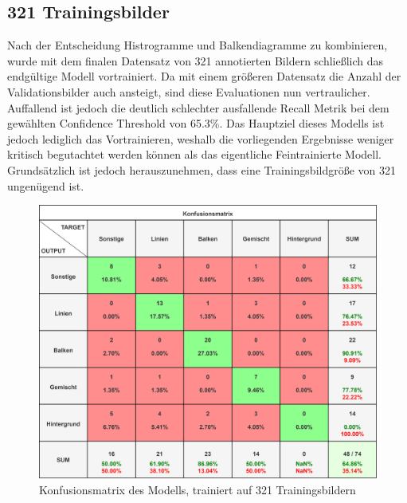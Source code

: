 \subsection*{321 Trainingsbilder}
Nach der Entscheidung Histrogramme und Balkendiagramme zu kombinieren, wurde mit dem finalen Datensatz von 321 annotierten Bildern schließlich das endgültige Modell vortrainiert. Da mit einem größeren Datensatz die Anzahl der Validationsbilder auch ansteigt, sind diese Evaluationen nun vertraulicher. Auffallend ist jedoch die deutlich schlechter ausfallende Recall Metrik bei dem gewählten Confidence Threshold von 65.3\%. Das Hauptziel dieses Modells ist jedoch lediglich das Vortrainieren, weshalb die vorliegenden Ergebnisse weniger kritisch begutachtet werden können als das eigentliche Feintrainierte Modell. Grundsätzlich ist jedoch herauszunehmen, dass eine Trainingsbildgröße von 321 ungenügend ist.

\begin{figure}[H]
    \centering
    \captionsetup{width=1\linewidth}
    \includegraphics[width=1\textwidth]{Experimente/img/detect/3_val@0.653_nohisto/konfusionsmatrix.png}
    \caption{ Konfusionsmatrix des Modells, trainiert auf 321 Trainingsbildern}
    \label{fig:extraction_output}
\end{figure}

